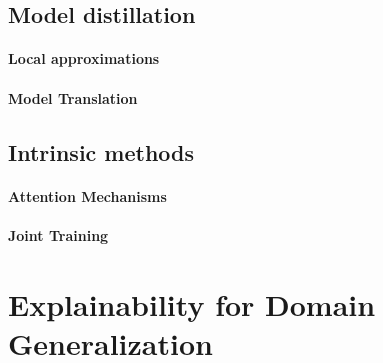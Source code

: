 \subsection{Model distillation}
\paragraph{Local approximations}
\paragraph{Model Translation}

\subsection{Intrinsic methods}
\paragraph{Attention Mechanisms}
\paragraph{Joint Training}

\section{Explainability for Domain Generalization}

\citep{zunino2020explainable}
